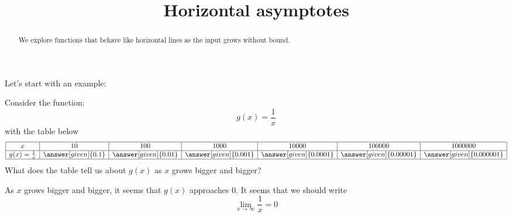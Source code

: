 \documentclass{ximera}
\title[Dig-In:]{Horizontal asymptotes}
\begin{document}
\begin{abstract}
We explore functions that behave like horizontal lines as the input
grows without bound.
\end{abstract}
\maketitle

Let's start with an example:
\begin{example}
Consider the function:
\[
g(x) = \frac{1}{x}
\]
with the table below
  \[
\begin{array}{|c|c|c|c|c|c|c|}
\hline
x & 10 & 100 & 1000 &10000 & 100000 & 1000000  \\\hline
g(x)=\frac{1}{x} & \answer[given]{0.1} & \answer[given]{0.01} & \answer[given]{0.001} & \answer[given]{0.0001} & \answer[given]{0.00001} & \answer[given]{0.000001} \\
\hline
\end{array}
  \]
  What does the table tell us about $g(x)$ as $x$ grows bigger and bigger?
  \begin{explanation}
    
As $x$ grows bigger and bigger, it seems that $g(x)$ approaches $0$. It seems that we should write
\[
 \lim_{x\to \infty}\frac{1}{x}=0 
 \]
  \end{explanation}
\end{example}
\end{document}
